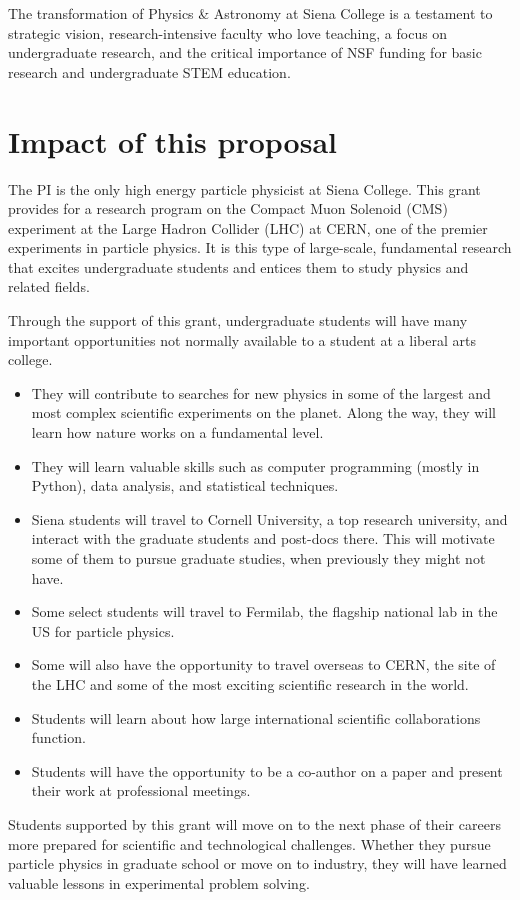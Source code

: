 \documentclass[11pt]{article}
\begin{document}
The transformation of Physics \& Astronomy at Siena College is a testament to strategic vision, research-intensive 
faculty who love teaching, a focus on undergraduate research, and the critical
importance of NSF funding for basic research and undergraduate STEM education. 

\section{Impact of this proposal}
The PI is the only high energy particle physicist at Siena College. This grant
provides for a research program on the Compact Muon Solenoid (CMS) experiment at
the Large Hadron Collider (LHC) at CERN, one of the premier experiments
in particle physics. It is this type of large-scale, fundamental 
research that excites undergraduate students and entices them to study 
physics and related fields.

Through the support of this grant, undergraduate students will have many important
opportunities not normally available to a student at a liberal arts college.
\begin{itemize}[itemsep=0pt,parsep=0pt,topsep=0pt,partopsep=0pt]
    \item They will contribute to searches for new physics in some of the largest
        and most complex scientific experiments on the planet.
        Along the way, they will learn how nature works on a fundamental
        level.
    \item They will learn valuable skills such as computer programming (mostly
        in Python), data analysis, and statistical techniques.
    \item Siena students will travel to Cornell University, a top research university,
        and interact with the graduate students and post-docs there.
        This will motivate some of them to pursue graduate studies,
        when previously they might not have.
    \item Some select students will travel to Fermilab, the flagship national lab in the US for particle
        physics. 
    \item Some will also have the opportunity to travel overseas to CERN, the site
        of the LHC and some of the most exciting scientific research in the world.
    \item Students will learn about how large international scientific collaborations function.
    \item Students will have the opportunity to be a co-author on a paper and present their
        work at professional meetings.
\end{itemize}

Students supported by this grant will move on to the next phase of their careers more prepared for scientific and technological challenges.  Whether they pursue particle physics in graduate school or move on to industry, they will have learned valuable lessons in experimental problem solving.


\end{document}

